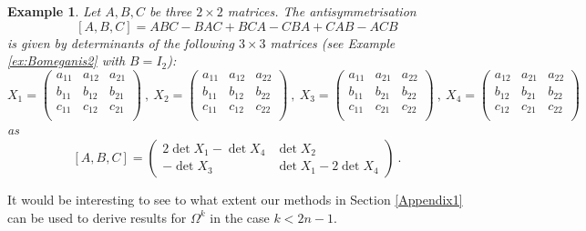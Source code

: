 \documentclass[10pt]{amsart}
\theoremstyle{plain}
\newtheorem{ex}[thm]{Example}
\newcommand{\0}{\color{blue}{\mathsf{0}}}
\begin{document}
\begin{ex}  Let $A,B,C$ be three  $2 \times 2$ matrices.
The antisymmetrisation
\[ [A,B,C]=   ABC- BAC +BCA - CBA+CAB- ACB\]
is given by determinants of the following $3\times 3$ matrices (see Example \ref{ex:Bomeganis2}
with $B=I_2$):
\[ X_1= \begin{pmatrix}   a_{11} & a_{12} & a_{21} \\
b_{11} & b_{12} & b_{21} \\
c_{11} & c_{12} & c_{21} \\
\end{pmatrix} 
\ , \ 
X_2  = \begin{pmatrix}   a_{11} & a_{12} & a_{22} \\
b_{11} & b_{12} & b_{22} \\
c_{11} & c_{12} & c_{22} \\
\end{pmatrix}  
\ , \ 
X_3  = \begin{pmatrix}   a_{11} & a_{21} & a_{22} \\
b_{11} & b_{21} & b_{22} \\
c_{11} & c_{21} & c_{22} \\
\end{pmatrix}  
\ , \ 
X_4  = \begin{pmatrix}   a_{12} & a_{21} & a_{22} \\
b_{12} & b_{21} & b_{22} \\
c_{12} & c_{21} & c_{22} \\
\end{pmatrix}
\] 
as
\[ 
[A,B,C] = \begin{pmatrix}
2 \det X_1 - \det X_4 &  \det X_2 \\ 
-\det X_3 &  \det X_1 - 2 \det X_4
\end{pmatrix}\ .
\]   
\end{ex} 

It would be interesting to see to what extent our methods in Section \ref{Appendix1} can be used to
derive results for $\Omega^k$ in the case $k<2n-1$.

\renewcommand\refname{References}




\end{document}
